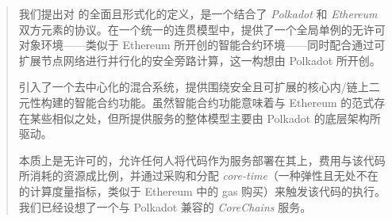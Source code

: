 \begin{abstract}


我们提出对 \Jam 的全面且形式化的定义，\Jam 是一个结合了 \emph{Polkadot} 和 \emph{Ethereum} 双方元素的协议。在一个统一的连贯模型中，\Jam 提供了一个全局单例的无许可对象环境——类似于 Ethereum 所开创的智能合约环境——同时配合通过可扩展节点网络进行并行化的安全旁路计算，这一构想由 Polkadot 所开创。

\Jam 引入了一个去中心化的混合系统，提供围绕安全且可扩展的核心内/链上二元性构建的智能合约功能。虽然智能合约功能意味着与 Ethereum 的范式存在某些相似之处，但所提供服务的整体模型主要由 Polkadot 的底层架构所驱动。

\Jam 本质上是无许可的，允许任何人将代码作为服务部署在其上，费用与该代码所消耗的资源成比例，并通过采购和分配 \emph{core-time}（一种弹性且无处不在的计算度量指标，类似于 Ethereum 中的 gas 购买）来触发该代码的执行。我们已经设想了一个与 Polkadot 兼容的 \emph{CoreChains} 服务。

\end{abstract}
